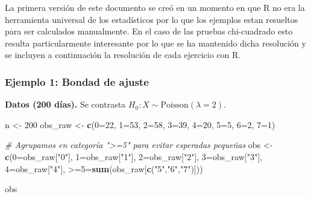 \documentclass[
]{article}
\newenvironment{Shaded}{\begin{snugshade}}{\end{snugshade}}
\newcommand{\AttributeTok}[1]{\textcolor[rgb]{0.13,0.29,0.53}{#1}}
\newcommand{\CommentTok}[1]{\textcolor[rgb]{0.56,0.35,0.01}{\textit{#1}}}
\newcommand{\DecValTok}[1]{\textcolor[rgb]{0.00,0.00,0.81}{#1}}
\newcommand{\FunctionTok}[1]{\textcolor[rgb]{0.13,0.29,0.53}{\textbf{#1}}}
\newcommand{\NormalTok}[1]{#1}
\newcommand{\OtherTok}[1]{\textcolor[rgb]{0.56,0.35,0.01}{#1}}
\newcommand{\StringTok}[1]{\textcolor[rgb]{0.31,0.60,0.02}{#1}}
\begin{document}
La primera versión de este documento se creó en un momento en que R no era la herramienta universal de los estadísticos por lo que los ejemplos estan resueltos para ser calculados manualmente. En el caso de las pruebas chi-cuadrado esto resulta particularmente interesante por lo que se ha mantenido dicha resolución y se incluyen a continuación la resolución de cada ejercicio con R.

\subsubsection{Ejemplo 1: Bondad de ajuste}\label{ejemplo-1-bondad-de-ajuste-1}

\textbf{Datos (200 días).} Se contrasta \(H_0: X \sim \text{Poisson}(\lambda=2)\).

\begin{Shaded}
\begin{Highlighting}[]
\NormalTok{n }\OtherTok{\textless{}{-}} \DecValTok{200}
\NormalTok{obs\_raw }\OtherTok{\textless{}{-}} \FunctionTok{c}\NormalTok{(}\StringTok{\textasciigrave{}}\AttributeTok{0}\StringTok{\textasciigrave{}}\OtherTok{=}\DecValTok{22}\NormalTok{, }\StringTok{\textasciigrave{}}\AttributeTok{1}\StringTok{\textasciigrave{}}\OtherTok{=}\DecValTok{53}\NormalTok{, }\StringTok{\textasciigrave{}}\AttributeTok{2}\StringTok{\textasciigrave{}}\OtherTok{=}\DecValTok{58}\NormalTok{, }\StringTok{\textasciigrave{}}\AttributeTok{3}\StringTok{\textasciigrave{}}\OtherTok{=}\DecValTok{39}\NormalTok{, }\StringTok{\textasciigrave{}}\AttributeTok{4}\StringTok{\textasciigrave{}}\OtherTok{=}\DecValTok{20}\NormalTok{, }\StringTok{\textasciigrave{}}\AttributeTok{5}\StringTok{\textasciigrave{}}\OtherTok{=}\DecValTok{5}\NormalTok{, }\StringTok{\textasciigrave{}}\AttributeTok{6}\StringTok{\textasciigrave{}}\OtherTok{=}\DecValTok{2}\NormalTok{, }\StringTok{\textasciigrave{}}\AttributeTok{7}\StringTok{\textasciigrave{}}\OtherTok{=}\DecValTok{1}\NormalTok{)}

\CommentTok{\# Agrupamos en categoría "\textgreater{}=5" para evitar esperadas pequeñas}
\NormalTok{obs }\OtherTok{\textless{}{-}} \FunctionTok{c}\NormalTok{(}\StringTok{\textasciigrave{}}\AttributeTok{0}\StringTok{\textasciigrave{}}\OtherTok{=}\NormalTok{obs\_raw[}\StringTok{"0"}\NormalTok{],}
         \StringTok{\textasciigrave{}}\AttributeTok{1}\StringTok{\textasciigrave{}}\OtherTok{=}\NormalTok{obs\_raw[}\StringTok{"1"}\NormalTok{],}
         \StringTok{\textasciigrave{}}\AttributeTok{2}\StringTok{\textasciigrave{}}\OtherTok{=}\NormalTok{obs\_raw[}\StringTok{"2"}\NormalTok{],}
         \StringTok{\textasciigrave{}}\AttributeTok{3}\StringTok{\textasciigrave{}}\OtherTok{=}\NormalTok{obs\_raw[}\StringTok{"3"}\NormalTok{],}
         \StringTok{\textasciigrave{}}\AttributeTok{4}\StringTok{\textasciigrave{}}\OtherTok{=}\NormalTok{obs\_raw[}\StringTok{"4"}\NormalTok{],}
         \StringTok{\textasciigrave{}}\AttributeTok{\textgreater{}=5}\StringTok{\textasciigrave{}}\OtherTok{=}\FunctionTok{sum}\NormalTok{(obs\_raw[}\FunctionTok{c}\NormalTok{(}\StringTok{"5"}\NormalTok{,}\StringTok{"6"}\NormalTok{,}\StringTok{"7"}\NormalTok{)]))}

\NormalTok{obs}
\end{Highlighting}
\end{Shaded}
\end{document}
